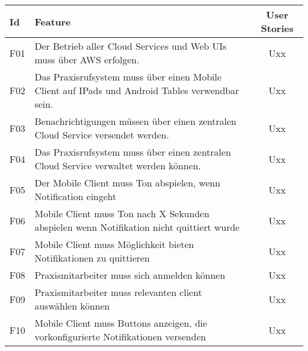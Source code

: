 \begin{table}[h]

    \centering
    \begin{tabular}{|l|p{13cm}|c|}
        \hline
        \textbf{Id} & \textbf{Feature}                                                                                                      & \textbf{User Stories} \\
        \hline
        F01        & Der Betrieb aller Cloud Services und Web UIs muss über AWS erfolgen.                                                  & Uxx                 \\
        \hline
        F02        & Das Praxisrufsystem muss über einen Mobile Client auf IPads und Android Tables verwendbar sein.                                                                                        & Uxx                 \\
        \hline
        F03        & Benachrichtigungen müssen über einen zentralen Cloud Service versendet werden.                                                              & Uxx                 \\
        \hline
        F04        & Das Praxisrufsystem muss über einen zentralen Cloud Service verwaltet werden können.                                                                                           & Uxx                 \\
        \hline
        F05        & Der Mobile Client muss Ton abspielen, wenn Notification eingeht                                                           & Uxx                 \\
        \hline
        F06        & Mobile Client muss Ton nach X Sekunden abspielen wenn Notifikation nicht quittiert wurde & Uxx \\
        \hline
        F07        & Mobile Client muss Möglichkeit bieten Notifikationen zu quittieren                                                    & Uxx                 \\
        \hline
        F08        & Praxismitarbeiter muss sich anmelden können                                                                           & Uxx                 \\
        \hline
        F09        & Praxismitarbeiter muss relevanten client auswählen können                                                             & Uxx                 \\
        \hline
        F10        & Mobile Client muss Buttons anzeigen, die vorkonfigurierte Notifikationen versenden & Uxx \\

\end{tabular}
\end{table}
